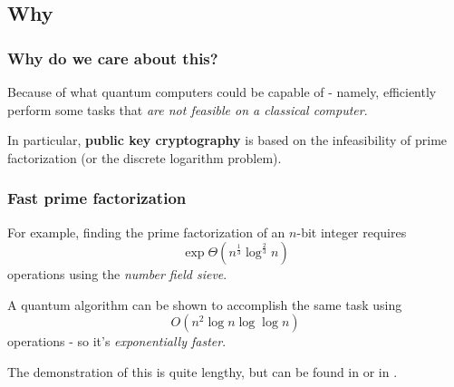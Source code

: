 \documentclass{beamer}
\begin{document}
  \subsection{Why}
  \begin{frame}
    \frametitle{Why do we care about this?}
    Because of what quantum computers could be capable of - namely, efficiently perform
    some tasks that \textit{are not feasible on a classical computer}.

    In particular, \textbf{public key cryptography} is based on the infeasibility of
    prime factorization (or the discrete logarithm problem).
  \end{frame}
  \begin{frame}
    \frametitle{Fast prime factorization}
    For example, finding the prime factorization of an $n$-bit integer requires
    \begin{equation*}
      \exp{\Theta\left(n^{\frac13}\log^{\frac23}n\right)}
    \end{equation*}
    operations using the \textit{number field sieve}.

    A quantum algorithm can be shown to accomplish the same task using
    \begin{equation*}
      O\left(n^2\log n \log\log n\right)
    \end{equation*}
    operations - so it's \textit{exponentially faster}.

    The demonstration of this is quite lengthy, but can be found in
    \cite{nielsen-chuang} or in \cite{de-wolf}.
  \end{frame}
\end{document}

